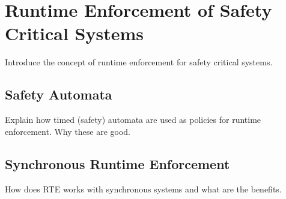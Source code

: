 \section{Runtime Enforcement of Safety Critical Systems}
Introduce the concept of runtime enforcement for safety critical systems.

\subsection{Safety Automata}
Explain how timed (safety) automata are used as policies for runtime enforcement.
Why these are good.

\subsection{Synchronous Runtime Enforcement}
How does RTE works with synchronous systems and what are the benefits.


